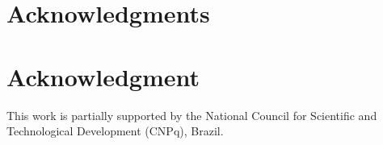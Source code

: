 \documentclass[conference,compsoc]{IEEEtran}
\begin{document}



\ifCLASSOPTIONcompsoc
  \section*{Acknowledgments}
\else
  \section*{Acknowledgment}
\fi

This work is partially supported by the National Council for Scientific and Technological Development (CNPq), Brazil.



%
\end{document}
